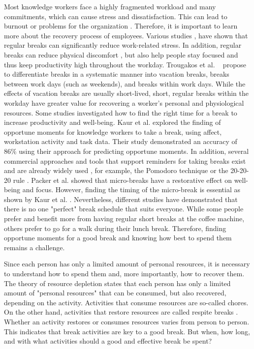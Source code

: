 \documentclass{hasel_thesis}
\begin{document}
Most knowledge workers face a highly fragmented workload and many commitments, which can cause stress and dissatisfaction. This can lead to burnout or problems for the organization \cite{Elkin.1990}. Therefore, it is important to learn more about the recovery process of employees. Various studies \cite{Largo-Wight.2017},\cite{KimS.ParkY.&Niu.2017} have shown that regular breaks can significantly reduce work-related stress.  In addition, regular breaks can reduce physical discomfort \cite{Waongenngarm.2018}, but also help people stay focused \cite{Ariga.2011} \cite{Bloom.2014} and thus keep productivity high throughout the workday. Trougakos et al. ~\cite{Trougakos.2009} propose to differentiate breaks in a systematic manner into vacation breaks, breaks between work days (such as weekends), and breaks within work days. While the effects of vacation breaks are usually short-lived, short, regular breaks within the workday have greater value for recovering a worker's personal and physiological resources.
Some studies investigated how to find the right time for a break to increase productivity and well-being. Kaur et al. \cite{Kaur.2020} explored the finding of opportune moments for knowledge workers to take a break, using affect, workstation activity and task data. Their study demonstrated an accuracy of 86\% using their approach for predicting opportune moments. In addition, several commercial approaches and tools that support reminders for taking breaks exist and are already widely used \cite{Alghamdi.2020}, for example, the Pomodoro technique \cite{Cirillo.2006} or the 20-20-20 rule \cite{Min.2019}. Packer et al. \cite{Packer.2021} showed that micro-breaks have a restorative effect on well-being and focus.  However, finding the timing of the micro-break is essential as shown by Kaur et al. \cite{Kaur.2020}. Nevertheless, different studies \cite{KimS.ParkY.&Niu.2017} \cite{Berman.2007} have demonstrated that there is no one "perfect" break schedule that suits everyone. While some people prefer and benefit more from having regular short breaks at the coffee machine, others prefer to go for a walk during their lunch break. Therefore, finding opportune moments for a good break and knowing how best to spend them remains a challenge. 

Since each person has only a limited amount of personal resources, it is necessary to understand how to spend them and, more importantly, how to recover them. The theory of resource depletion \cite{BaumeisterR.F.BratslavskyE.MuravenM.&TiceD.M..1998} states that each person has only a limited amount of "personal resources" that can be consumed, but also recovered, depending on the activity. Activities that consume resources are so-called chores. On the other hand, activities that restore resources are called respite breaks \cite{Trougakos.2009}. Whether an activity restores or consumes resources varies from person to person. This indicates that break activities are key to a good break. But when, how long, and with what activities should a good and effective break be spent? 
\end{document}
